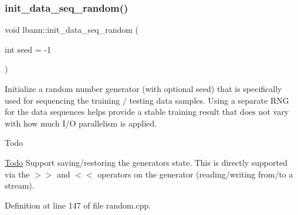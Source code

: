 \subsubsection{\texorpdfstring{init\+\_\+data\+\_\+seq\+\_\+random()}{init\_data\_seq\_random()}}
{\footnotesize\ttfamily void lbann\+::init\+\_\+data\+\_\+seq\+\_\+random (\begin{DoxyParamCaption}\item[{int}]{seed = {\ttfamily -\/1} }\end{DoxyParamCaption})}

Initialize a random number generator (with optional seed) that is specifically used for sequencing the training / testing data samples. Using a separate R\+NG for the data sequences helps provide a stable training result that does not vary with how much I/O parallelism is applied. \begin{DoxyRefDesc}{Todo}
\item[\hyperlink{todo__todo000031}{Todo}]Support saving/restoring the generator\textquotesingle{}s state. This is directly supported via the $>$$>$ and $<$$<$ operators on the generator (reading/writing from/to a stream). \end{DoxyRefDesc}


Definition at line 147 of file random.\+cpp.


